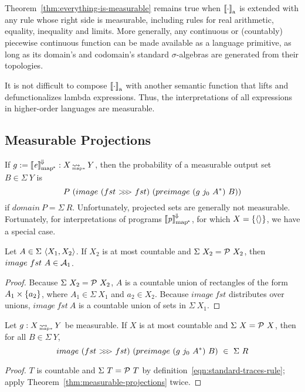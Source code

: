 \documentclass[preprint]{sigplanconf}
\newcommand{\arrow}{\rightsquigarrow}
\newcommand{\conv}{^{\mspace{-2mu}\Downarrow\mspace{-2mu}}}
\newcommand{\meaningofconv}[1]{\left\llbracket{#1}\right\rrbracket\conv}
\newcommand{\arrowcomp}{\ensuremath{{>}\mspace{-6mu}{>}\mspace{-6mu}{>}}}
\newcommand{\gen}{_\mathrm{a}}
\newcommand{\pmap}{_\mathrm{map^{\mspace{-2mu}*}}}
\DeclareMathOperator{\pmapto}{\arrow_{\mspace{-22mu}_{\mathrm{map*}}}}
\begin{document}
Theorem~\ref{thm:everything-is-measurable} remains true when $\meaningof{\cdot}\gen$ is extended with any rule whose right side is measurable, including rules for real arithmetic, equality, inequality and limits.
More generally, any continuous or (countably) piecewise continuous function can be made available as a language primitive, as long as its domain's and codomain's standard $\sigma$-algebras are generated from their topologies.

It is not difficult to compose $\meaningof{\cdot}\gen$ with another semantic function that lifts and defunctionalizes lambda expressions.
Thus, the interpretations of all expressions in higher-order languages are measurable.

\subsection{Measurable Projections}

If $g := \meaningofconv{\mathit{e}}\pmap : X \pmapto Y$, then the probability of a measurable output set $B \in \Sigma~Y$ is
\begin{equation}
	P~(image~(fst~\arrowcomp~fst)~(preimage~(g~j_0~A^*)~B))
\end{equation}
if $domain~P = \Sigma~R$. 
Unfortunately, projected sets are generally not measurable.
Fortunately, for interpretations of programs $\meaningofconv{\mathit{p}}\pmap$, for which $X = \{{\langle{}\rangle}\}$, we have a special case.

\begin{theorem}
Let $A \in \Sigma~\langle{X_1,X_2}\rangle$.
If $X_2$ is at most countable and $\Sigma~X_2 = \mathcal{P}~X_2$, then $image~fst~A \in \mathcal{A}_1$.
\label{thm:measurable-projections}
\end{theorem}
\begin{proof}
Because $\Sigma~X_2 = \mathcal{P}~X_2$, $A$ is a countable union of rectangles of the form $A_1 \times \{{a_2}\}$, where $A_1 \in \Sigma~X_1$ and $a_2 \in X_2$.
Because $image~fst$ distributes over unions, $image~fst~A$ is a countable union of sets in $\Sigma~X_1$.
\end{proof}

\begin{theorem}
Let $g : X \pmapto Y$ be measurable.
If $X$ is at most countable and $\Sigma~X = \mathcal{P}~X$, then for all $B \in \Sigma~Y$,
\begin{equation}
	image~(fst~\arrowcomp~fst)~(preimage~(g~j_0~A^*)~B) \ \in\ \Sigma~R
\end{equation}
\end{theorem}
\begin{proof}
$T$ is countable and $\Sigma~T = \mathcal{P}~T$ by definition~\eqref{eqn:standard-traces-rule}; apply Theorem~\ref{thm:measurable-projections} twice.
\end{proof}
\end{document}
